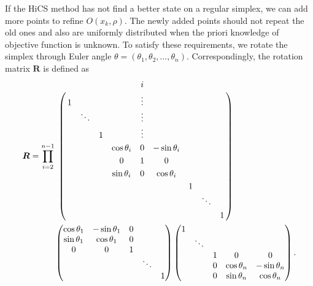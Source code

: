 \documentclass[final,1p,times]{elsarticle}
\begin{document}
If the HiCS method has not find a better state on a regular
simplex, we can add more points to refine $O(x_k, \rho)$.
The newly added points should not repeat the old ones and also
are uniformly distributed when the priori knowledge of
objective function is unknown.
To satisfy these requirements, we rotate the simplex through
Euler angle $\theta=(\theta_1,\theta_2,\dots,\theta_{n})$.
Correspondingly, the rotation matrix $\bm R$ is defined as 
\begin{equation}
\begin{aligned}
	{\bm R} = 
	 \prod_{i=2}^{n-1} &
\bordermatrix{
  &  &       &  & 		   & i &		   &  &  & \cr
  & 1&       &  & 		   & \vdots  & 		   &  &  &  \cr
  &  & \ddots&  & 		   & \vdots  & 		   &  &  &  \cr
  &  &       & 1&          & \vdots  & 		   &  &  &  \cr
  &  &       &  & \cos \theta_i & 0 & -\sin \theta_i &  &  &  \cr
  &  &       &  &   0	 & 1 &     0     &  &  & \cr 
  &  &       &  & \sin \theta_i & 0 &  \cos \theta_i &  &  &  \cr
  &  &       &  &          &   &           & 1 & &  \cr
  &  &       &  &          &   &           &  & \ddots &   \cr
  &  &       &  &          &   &           &  &  & 1 
}
\\
	& \begin{pmatrix}
  \cos \theta_1 & -\sin \theta_1 & 0 &  		&   \\
  \sin \theta_1 & \cos \theta_1  & 0 & 	 	& 	\\
  	0	   &      0    & 1 & 		&   \\
  		   & 		   &   & \ddots &   \\
  		   & 		   &   &   		& 1 
	\end{pmatrix}
	\begin{pmatrix}
  1 &  &  &  		&   \\
    & \ddots  &  & 	 	& 	\\
    &    & 1 & 	0	& 0  \\
    &    & 0 & \cos\theta_n & -\sin\theta_n  \\
    & 	 & 0 &  \sin\theta_n & \cos\theta_n 
	\end{pmatrix}.
\end{aligned}
	\label{}
\end{equation}
\end{document}
